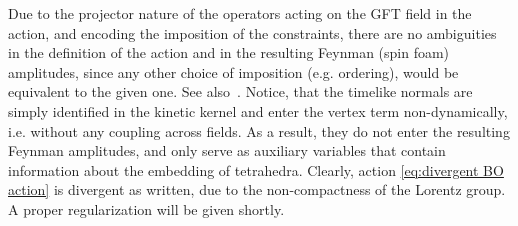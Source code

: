 \documentclass[11pt,a4paper]{article}
\begin{document}
Due to the projector nature of the operators acting on the GFT field in the action, and encoding the imposition of the constraints, there are no ambiguities in the definition of the action and in the resulting Feynman (spin foam) amplitudes, since any other choice of imposition (e.g. ordering), would be equivalent to the given one. See also~\cite{Baratin:2011tx}. Notice, that the timelike normals are simply identified in the kinetic kernel and enter the vertex term non-dynamically, i.e. without any coupling across fields. As a result, they do not enter the resulting Feynman amplitudes, and only serve as auxiliary variables that contain information about the embedding of tetrahedra. Clearly, action \eqref{eq:divergent BO action} is divergent as written, due to the non-compactness of the Lorentz group. A proper regularization will be given shortly.
\end{document}
